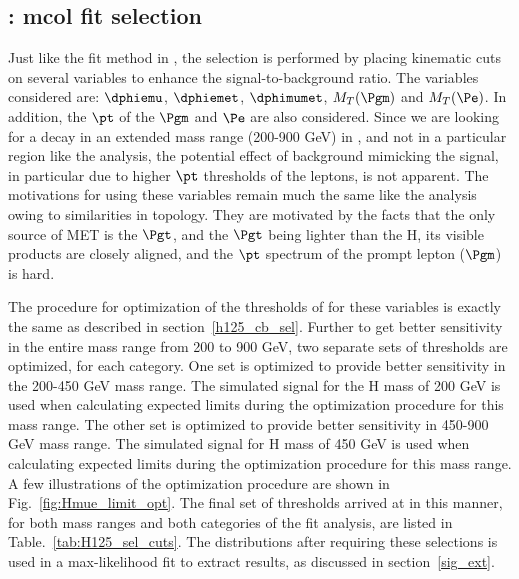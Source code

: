\subsection{\Hmue: mcol fit selection}
\label{H125_cb_sel}
 Just like the \mcol fit method in \hmue, the selection is performed by placing kinematic cuts on several variables to enhance the signal-to-background ratio. The variables considered are: $\dphiemu$, $\dphiemet$, $\dphimumet$, $M_T(\Pgm)$ and $M_T(\Pe)$. In addition, the $\pt$ of the $\Pgm$ and $\Pe$ are also considered. Since we are looking for a decay in an extended mass range (200-900 GeV) in \Hmue, and not in a particular region like the \hmue analysis, the potential effect of background  mimicking the signal, in particular due to higher $\pt$ thresholds of the leptons, is not apparent. The motivations for using these variables remain much the same like the \hmue analysis owing to similarities in topology. They are motivated by the facts that the only source of MET is the $\Pgt$, and the  $\Pgt$ being lighter than the H, its visible products are closely aligned, and the $\pt$ spectrum of the prompt lepton ($\Pgm$) is hard.

The procedure for optimization of the thresholds of for these variables is exactly the same as described in section~\ref{h125_cb_sel}. Further to get better sensitivity in the entire mass range from 200 to 900 GeV, two separate sets of thresholds are optimized, for each category. One set is optimized to provide better sensitivity in the 200-450 GeV mass range. The simulated signal for the H mass of 200 GeV is used when calculating expected limits during the optimization procedure for this mass range. The other set is optimized to provide better sensitivity in 450-900 GeV mass range. The simulated signal for H mass of 450 GeV is used when calculating expected limits during the optimization procedure for this mass range. A few illustrations of the optimization procedure are shown in Fig.~\ref{fig:Hmue_limit_opt}. The final set of thresholds arrived at in this manner, for both mass ranges and both categories of the \Hmue \mcol fit analysis, are listed in Table.~\ref{tab:H125_sel_cuts}. The \mcol distributions after requiring these selections is used in a max-likelihood fit to extract results, as discussed in section~\ref{sig_ext}.


